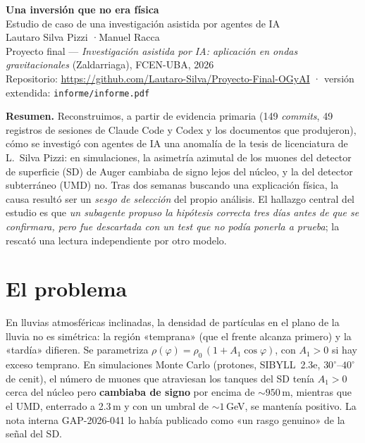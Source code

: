 \documentclass[11pt,a4paper]{article}
\newcommand{\code}[1]{\texttt{#1}}
\begin{document}
\begin{center}
{\LARGE\bfseries Una inversión que no era física}\\[3pt]
{\large Estudio de caso de una investigación asistida por agentes de IA}\\[5pt]
Lautaro Silva Pizzi \quad·\quad Manuel Racca\\[1pt]
{\small Proyecto final — \emph{Investigación asistida por IA: aplicación en ondas gravitacionales} (Zaldarriaga), FCEN-UBA, 2026}\\
{\small Repositorio: \url{https://github.com/Lautaro-Silva/Proyecto-Final-OGyAI} \;·\; versión extendida: \code{informe/informe.pdf}}
\end{center}

\noindent\textbf{Resumen.} Reconstruimos, a partir de evidencia primaria (149 \emph{commits}, 49 registros de sesiones
de Claude Code y Codex y los documentos que produjeron), cómo se investigó con agentes de IA una anomalía de la tesis
de licenciatura de L.~Silva Pizzi: en simulaciones, la asimetría azimutal de los muones del detector de superficie (SD)
de Auger cambiaba de signo lejos del núcleo, y la del detector subterráneo (UMD) no. Tras dos semanas buscando una
explicación física, la causa resultó ser un \emph{sesgo de selección} del propio análisis. El hallazgo central del
estudio es que \emph{un subagente propuso la hipótesis correcta tres días antes de que se confirmara, pero fue
descartada con un test que no podía ponerla a prueba}; la rescató una lectura independiente por otro modelo.

\section{El problema}
En lluvias atmosféricas inclinadas, la densidad de partículas en el plano de la lluvia no es simétrica: la región
«temprana» (que el frente alcanza primero) y la «tardía» difieren. Se parametriza
$\rho(\varphi)=\rho_0\,(1+A_1\cos\varphi)$, con $A_1>0$ si hay exceso temprano. En simulaciones Monte Carlo (protones,
SIBYLL~2.3e, $30^\circ$--$40^\circ$ de cenit), el número de muones que atraviesan los tanques del SD tenía $A_1>0$ cerca
del núcleo pero \textbf{cambiaba de signo} por encima de $\sim 950$\,m, mientras que el UMD, enterrado a 2.3\,m y con un
umbral de $\sim 1$\,GeV, se mantenía positivo. La nota interna GAP-2026-041 lo había publicado como «un rasgo genuino»
de la señal del SD.
\end{document}
